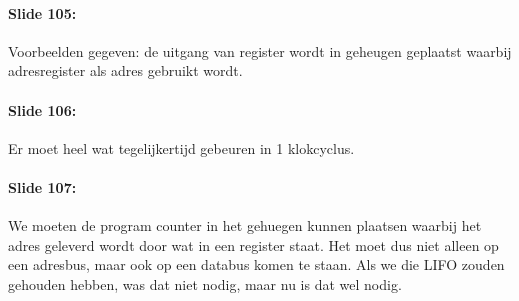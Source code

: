 \documentclass[10pt,a4paper]{book}
\begin{document}
\paragraph{Slide 105:} Voorbeelden gegeven: de uitgang van register wordt in geheugen geplaatst waarbij adresregister als adres gebruikt wordt.

\paragraph{Slide 106:} Er moet heel wat tegelijkertijd gebeuren in 1 klokcyclus.

\paragraph{Slide 107:} We moeten de program counter in het gehuegen kunnen plaatsen waarbij het adres geleverd wordt door wat in een register staat. Het moet dus niet alleen op een adresbus, maar ook op een databus komen te staan. Als we die LIFO zouden gehouden hebben, was dat niet nodig, maar nu is dat wel nodig.
\end{document}
